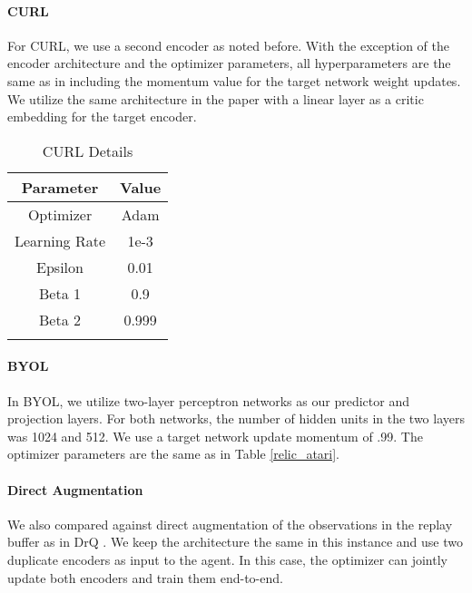 \documentclass{article}
\begin{document}
\paragraph{CURL}
For CURL, we use a second encoder as noted before. With the exception of the encoder architecture and the optimizer parameters, all hyperparameters are the same as in \citep{srinivas2020curl} including the momentum value for the target network weight updates. We utilize the same architecture in the paper with a linear layer as a critic embedding for the target encoder.

\begin{table}[ht]
  \caption{CURL Details}
  \vspace{0.2cm}
  \centering
  \begin{tabular}{cc}
    \toprule
    Parameter     & Value \\
    \midrule
    Optimizer & Adam \\
    Learning Rate & 1e-3 \\
    Epsilon & 0.01 \\
    Beta 1 & 0.9 \\
    Beta 2 & 0.999 \\
    \bottomrule
    \label{curl_atari}
  \end{tabular}
\end{table}

\paragraph{BYOL}
In BYOL, we utilize two-layer perceptron networks as our predictor and projection layers. For both networks, the number of hidden units in the two layers was 1024 and 512. We use a target network update momentum of .99. The optimizer parameters are the same as in Table  \ref{relic_atari}.

\paragraph{Direct Augmentation}
We also compared against direct augmentation of the observations in the replay buffer as in DrQ \citep{kostrikov2020image}. We keep the architecture the same in this instance and use two duplicate encoders as input to the agent. In this case, the optimizer can jointly update both encoders and train them end-to-end.
\end{document}
